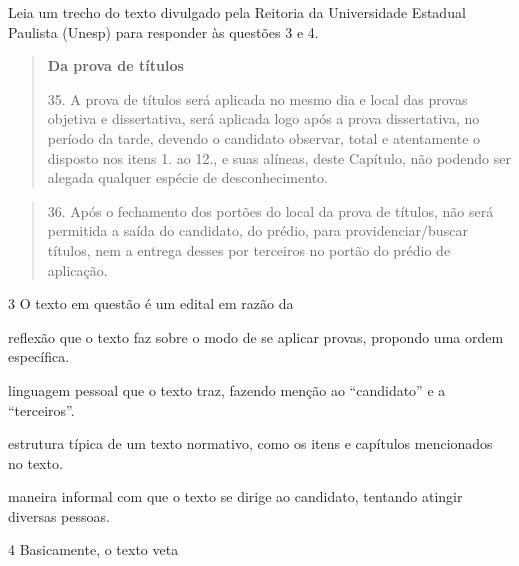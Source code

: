 Leia um trecho do texto divulgado pela Reitoria da Universidade Estadual
Paulista (Unesp) para responder às questões 3 e 4.

\begin{quote}
\textbf{Da prova de títulos}


35. A prova de títulos será aplicada no mesmo dia e local das provas
objetiva e dissertativa, será aplicada logo após a prova dissertativa,
no período da tarde, devendo o candidato observar, total e atentamente o
disposto nos itens 1. ao 12., e suas alíneas, deste Capítulo, não
podendo ser alegada qualquer espécie de desconhecimento.
\end{quote}

\pagebreak
\begin{quote}
36. Após o fechamento dos portões do local da prova de títulos, não será
permitida a saída do candidato, do prédio, para providenciar/buscar
títulos, nem a entrega desses por terceiros no portão do prédio de
aplicação.

\end{quote}

\num{3} O texto em questão é um edital em razão da

\begin{escolha}
\item reflexão que o texto faz sobre o modo de se aplicar provas, propondo
uma ordem específica.

\item linguagem pessoal que o texto traz, fazendo menção ao ``candidato''
e a ``terceiros''.

\item estrutura típica de um texto normativo, como os itens e capítulos
mencionados no texto.

\item maneira informal com que o texto se dirige ao candidato, tentando
atingir diversas pessoas.
\end{escolha}

\num{4} Basicamente, o texto veta

